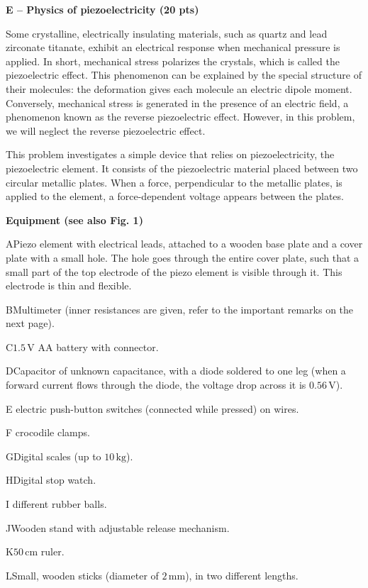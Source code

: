 {\large\textbf{E – Physics of piezoelectricity (20 pts)}}

Some crystalline, electrically insulating materials, such as quartz and lead
zirconate titanate, exhibit an electrical response when mechanical pressure is
applied. In short, mechanical stress polarizes the crystals, which is called
the piezoelectric effect. This phenomenon can be explained by the special
structure of their molecules: the deformation gives each molecule an electric
dipole moment. Conversely, mechanical stress is generated in the presence of an
electric field, a phenomenon known as the reverse piezoelectric effect.
However, in this problem, we will neglect the reverse piezoelectric effect.

This problem investigates a simple device that relies on piezoelectricity, the
piezoelectric element. It consists of the piezoelectric material placed between
two circular metallic plates. When a force, perpendicular to the metallic
plates, is applied to the element, a force-dependent voltage appears between
the plates.

\textbf{Equipment (see also Fig. 1)}

A\quad Piezo element with electrical leads, attached to a wooden base plate and
a cover plate with a small hole. The hole goes through the entire cover plate,
such that a small part of the top electrode of the piezo element is visible
through it. This electrode is thin and flexible.

B\quad Multimeter (inner resistances are given, refer to the important remarks
on the next page).

C\quad $1.5\,\mathrm{V}$ AA battery with connector.

D\quad Capacitor of unknown capacitance, with a diode soldered to one leg (when
a forward current flows through the diode, the voltage drop across it is
$0.56\,\mathrm{V}$).

E electric push-button switches (connected while pressed) on wires.

F crocodile clamps.

G\quad Digital scales (up to $10\,\mathrm{kg}$).

H\quad Digital stop watch.

I different rubber balls.

J\quad Wooden stand with adjustable release mechanism.

K\quad $50\,\mathrm{cm}$ ruler.

L\quad Small, wooden sticks (diameter of $2\,\mathrm{mm}$), in two different
lengths.

